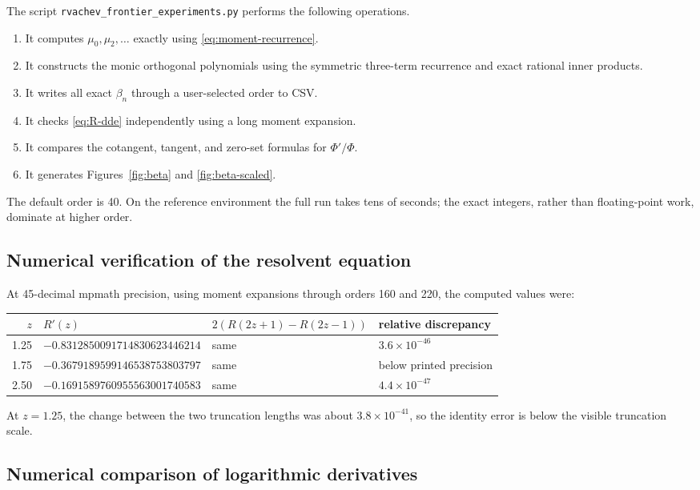 \documentclass[11pt]{article}
\theoremstyle{definition}
\theoremstyle{remark}
\begin{document}
The script \texttt{rvachev\_frontier\_experiments.py} performs the following operations.

\begin{enumerate}
\item It computes \(\mu_0,\mu_2,\dots\) exactly using \eqref{eq:moment-recurrence}.
\item It constructs the monic orthogonal polynomials using the symmetric three-term
      recurrence and exact rational inner products.
\item It writes all exact \(\beta_n\) through a user-selected order to CSV.
\item It checks \eqref{eq:R-dde} independently using a long moment expansion.
\item It compares the cotangent, tangent, and zero-set formulas for \(\Phi'/\Phi\).
\item It generates Figures~\ref{fig:beta} and \ref{fig:beta-scaled}.
\end{enumerate}

The default order is 40.  On the reference environment the full run takes tens of seconds;
the exact integers, rather than floating-point work, dominate at higher order.

\subsection{Numerical verification of the resolvent equation}

At 45-decimal mpmath precision, using moment expansions through orders 160 and 220, the
computed values were:
\begin{center}
\footnotesize
\begin{tabular}{rlll}
\toprule
\(z\) & \(R'(z)\) & \(2(R(2z+1)-R(2z-1))\) & relative discrepancy \\
\midrule
1.25 & \(-0.8312850091714830623446214\) & same & \(3.6\times10^{-46}\) \\
1.75 & \(-0.3679189599146538753803797\) & same & below printed precision \\
2.50 & \(-0.1691589760955563001740583\) & same & \(4.4\times10^{-47}\) \\
\bottomrule
\end{tabular}
\end{center}
At \(z=1.25\), the change between the two truncation lengths was about
\(3.8\times10^{-41}\), so the identity error is below the visible truncation scale.

\subsection{Numerical comparison of logarithmic derivatives}
\end{document}
